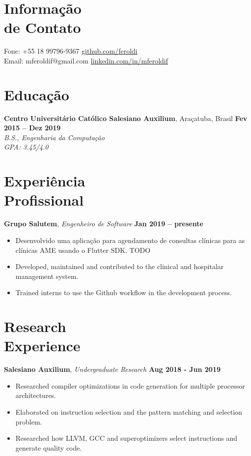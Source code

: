 \documentclass[margin,line]{resume}
\begin{document}
\begin{resume}
    \section{\mysidestyle Informação\\de Contato}

    Fone: +55 18 99796-9367 \hfill \url{github.com/feroldi}\\
    \noindent Email: mferoldif@gmail.com \hfill \url{linkedin.com/in/mferoldif}

    \section{\mysidestyle Educação}

    \textbf{Centro Universitário Católico Salesiano Auxilium}, Araçatuba, Brasil \hfill \textbf{Fev 2015 -- Dez 2019}\\
    \textsl{B.S., Engenharia da Computação}\\
    \textsl{GPA: 3.45/4.0}

    \section{\mysidestyle Experiência\\Profissional}

    \textbf{Grupo Salutem}, \textit{Engenheiro de Software} \hfill \textbf{Jan 2019 -- presente}
    \begin{itemize}
        \item Desenvolvido uma aplicação para agendamento de consultas clínicas para as clínicas AME usando o Flutter SDK.
            TODO
        \item Developed, maintained and contributed to the clinical and hospitalar management system.
        \item Trained interns to use the Github workflow in the development process.
    \end{itemize}

    \section{\mysidestyle Research\\Experience}

    \textbf{Salesiano Auxilium}, \textsl{Undergraduate Research} \hfill \textbf{Aug 2018 - Jun 2019}
    \begin{itemize}
        \item Researched compiler optimizations in code generation for multiple processor architectures.
        \item Elaborated on instruction selection and the pattern matching and selection problem.
        \item Researched how LLVM, GCC and superoptimizers select instructions and generate quality code.
    \end{itemize}


\end{resume}
\end{document}
